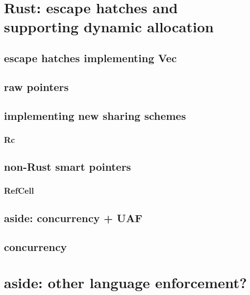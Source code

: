 \section{Rust: escape hatches and supporting dynamic allocation}


\subsection{escape hatches implementing Vec}


\subsection{raw pointers}



\subsection{implementing new sharing schemes}
\subsubsection{Rc}


\subsection{non-Rust smart pointers}


\subsubsection{RefCell}


\subsection{aside: concurrency + UAF}


\subsection{concurrency}


\section{aside: other language enforcement?}


